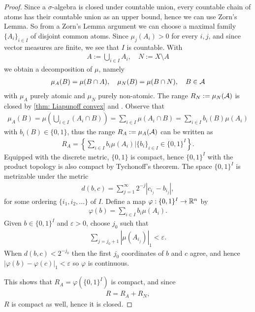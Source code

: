 \begin{proof}
Since a $\sigma$-algebra is closed under countable union, every countable chain of atoms has their countable union as an upper bound, hence we can use Zorn's Lemma.
So from a Zorn's Lemma argument we can choose a maximal family $\{A_{i}\}_{i\in I}$ of disjoint common atoms. Since $\mu_{j}(A_{i})>0$ for every $i,j$, and since vector measures are finite, we see that $I$ is countable. With
\begin{align*}
	A:=\bigcup_{i\in I} A_{i}, \quad N:=X\setminus A
\end{align*}
we obtain a decomposition of $\mu$, namely
\begin{align*}
	\mu_{A}(B)=\mu(B\cap A), \quad \mu_{N}(B)=\mu(B\cap N), \quad B\in \mathcal{A}
\end{align*}
with $\mu_{A}$ purely atomic and $\mu_{N}$ purely non-atomic.
The range $R_{N}:=\mu_{N}(\mathcal{A})$ is closed by \cref{thm: Liapunoff convex} and . Observe that
\begin{align*}
	\mu_{A}(B)=\mu\left( \bigcup_{i\in I} (A_{i} \cap B) \right) = \sum_{i\in I} \mu(A_{i}\cap B)=\sum_{i\in I} b_{i}(B)\mu(A_{i})
\end{align*}
with $b_{i}(B)\in \{0,1\}$, thus the range $R_{A}:=\mu_{A}(\mathcal{A})$ can be written as
\begin{align*}
	R_{A}=\left\{ \sum_{i\in I} b_{i}\mu(A_{i}) | \{b_{i}\}_{i\in I} \in \{0,1\}^{I} \right\}.
\end{align*}
Equipped with the discrete metric, $\{0,1\}$ is compact, hence $\{0,1\}^{I}$ with the product topology is also compact by Tychonoff's theorem. %
The space $\{0,1\}^{I}$ is metrizable under the metric
\begin{align*}
	d(b,c)=\sum_{j=1}^{\infty}2^{-j}|c_{i_{j}} - b_{i_{j}}|,
\end{align*}
for some ordering $\{i_{1}, i_{2}, \dots\}$ of $I$. Define a map $\varphi:\{0,1\}^{I}\to \mathbb{R}^{n}$ by
\begin{align*}
	\varphi(b)=\sum_{i\in I} b_{i} \mu(A_{i}).
\end{align*}
Given $b\in \{0,1\}^{I}$ and $\varepsilon>0$, choose $j_{0}$ such that
\begin{align*}
	\sum_{j=j_{0}+1}|\mu(A_{i_{j}})|_{1}<\varepsilon.
\end{align*}
When $d(b,c)<2^{-j_{0}}$ then the first $j_{0}$ coordinates of $b$ and $c$ agree, and hence $| \varphi(b) - \varphi(c) |_{1} < \varepsilon$ so $\varphi$ is continuous.

This shows that $R_{A}=\varphi(\{0,1\}^{I})$ is compact, and since
\begin{align*}
	R=R_{A}+R_{N},
\end{align*}
$R$ is compact as well, hence it is closed.


\end{proof}
